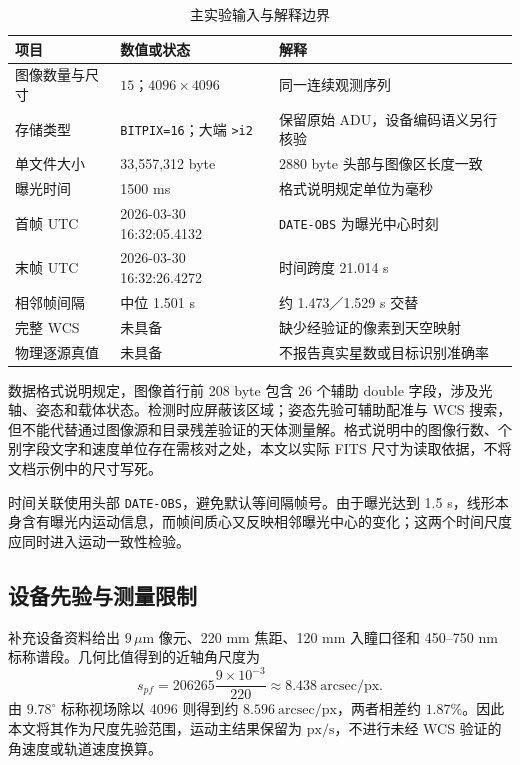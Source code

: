 \documentclass[UTF8,a4paper,11pt,fontset=windows]{ctexart}
\newcommand{\px}{\mathrm{px}}
\begin{document}
\begin{table}[!htbp]\centering\small
\caption{主实验输入与解释边界}\label{tab:data}
\begin{tabularx}{\linewidth}{l l Y}\toprule
项目 & 数值或状态 & 解释\\\midrule
图像数量与尺寸 & $15$；$4096\times4096$ & 同一连续观测序列\\
存储类型 & \texttt{BITPIX=16}；大端 \texttt{>i2} & 保留原始 ADU，设备编码语义另行核验\\
单文件大小 & 33,557,312 byte & 2880 byte 头部与图像区长度一致\\
曝光时间 & 1500 ms & 格式说明规定单位为毫秒\\
首帧 UTC & 2026-03-30 16:32:05.4132 & \texttt{DATE-OBS} 为曝光中心时刻\\
末帧 UTC & 2026-03-30 16:32:26.4272 & 时间跨度 21.014 s\\
相邻帧间隔 & 中位 1.501 s & 约 1.473／1.529 s 交替\\
完整 WCS & 未具备 & 缺少经验证的像素到天空映射\\
物理逐源真值 & 未具备 & 不报告真实星数或目标识别准确率\\\bottomrule
\end{tabularx}
\end{table}

数据格式说明规定，图像首行前 208 byte 包含 26 个辅助 double 字段，涉及光轴、姿态和载体状态。检测时应屏蔽该区域；姿态先验可辅助配准与 WCS 搜索，但不能代替通过图像源和目录残差验证的天体测量解。格式说明中的图像行数、个别字段文字和速度单位存在需核对之处，本文以实际 FITS 尺寸为读取依据，不将文档示例中的尺寸写死。

时间关联使用头部 \texttt{DATE-OBS}，避免默认等间隔帧号。由于曝光达到 1.5 s，线形本身含有曝光内运动信息，而帧间质心又反映相邻曝光中心的变化；这两个时间尺度应同时进入运动一致性检验。

\subsection{设备先验与测量限制}
补充设备资料给出 $9\,\mu\mathrm{m}$ 像元、220 mm 焦距、120 mm 入瞳口径和 450--750 nm 标称谱段。几何比值得到的近轴角尺度为
\begin{equation}
 s_{pf}=206265\frac{9\times10^{-3}}{220}\approx8.438\ \mathrm{arcsec/px}.
\end{equation}
由 $9.78^\circ$ 标称视场除以 4096 则得到约 $8.596\ \mathrm{arcsec/px}$，两者相差约 $1.87\%$。因此本文将其作为尺度先验范围，运动主结果保留为 $\px/\mathrm{s}$，不进行未经 WCS 验证的角速度或轨道速度换算。
\end{document}
